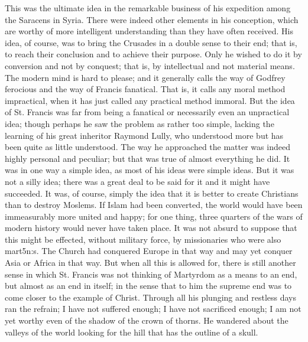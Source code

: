 \documentclass{book}
\begin{document}
This was the ultimate idea in the remarkable business of his expedition among the Saracens in Syria. There were indeed other elements in his conception, which are worthy of more intelligent understanding than they have often received. His idea, of course, was to bring the Crusades in a double sense to their end; that is, to reach their conclusion and to achieve their purpose. Only he wished to do it by conversion and not by conquest; that is, by intellectual and not material means. The modern mind is hard to please; and it generally calls the way of Godfrey ferocious and the way of Francis fanatical. That is, it calls any moral method impractical, when it has just called any practical method immoral. But the idea of St. Francis was far from being a fanatical or necessarily even an unpractical idea; though perhaps he saw the problem as rather too simple, lacking the learning of his great inheritor Raymond Lully, who understood more but has been quite as little understood. The way he approached the matter was indeed highly personal and peculiar; but that was true of almost everything he did. It was in one way a simple idea, as most of his ideas were simple ideas. But it was not a silly idea; there was a great deal to be said for it and it might have succeeded. It was, of course, simply the idea that it is better to create Christians than to destroy Moslems. If Islam had been converted, the world would have been immeasurably more united and happy; for one thing, three quarters of the wars of modern history would never have taken place. It was not absurd to suppose that this might be effected, without military force, by missionaries who were also mart5n:s. The Church had conquered Europe in that way and may yet conquer Asia or Africa in that way. But when all this is allowed for, there is still another sense in which St. Francis was not thinking of Martyrdom as a means to an end, but almost as an end in itself; in the sense that to him the supreme end was to come closer to the example of Christ. Through all his plunging and restless days ran the refrain; I have not suffered enough; I have not sacrificed enough; I am not yet worthy even of the shadow of the crown of thorns. He wandered about the valleys of the world looking for the hill that has the outline of a skull.
\end{document}
